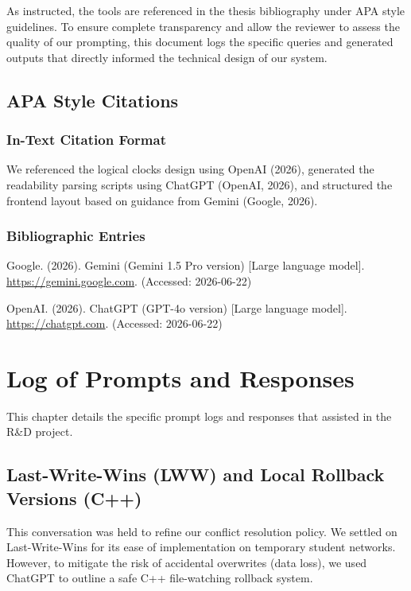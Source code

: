 \documentclass[12pt,oneside]{report}
\newenvironment{hangparas}[2]{
  \setlength{\parindent}{-#1}
  \setlength{\leftmargin}{#1}
  \setlength{\itemindent}{-#1}
  \list{}{
    \setlength{\leftmargin}{#1}
    \setlength{\itemindent}{-#1}
    \setlength{\parsep}{\parskip}
  }
  \item[]
}{
  \endlist
}
\begin{document}
As instructed, the tools are referenced in the thesis bibliography under APA style guidelines. To ensure complete transparency and allow the reviewer to assess the quality of our prompting, this document logs the specific queries and generated outputs that directly informed the technical design of our system.

\section*{APA Style Citations}

\subsection*{In-Text Citation Format}
We referenced the logical clocks design using OpenAI (2026), generated the readability parsing scripts using ChatGPT (OpenAI, 2026), and structured the frontend layout based on guidance from Gemini (Google, 2026).

\subsection*{Bibliographic Entries}
\begin{hangparas}{.5in}{1}
Google. (2026). Gemini (Gemini 1.5 Pro version) [Large language model]. \url{https://gemini.google.com}. (Accessed: 2026-06-22)

OpenAI. (2026). ChatGPT (GPT-4o version) [Large language model]. \url{https://chatgpt.com}. (Accessed: 2026-06-22)
\end{hangparas}


\newpage
\chapter{Log of Prompts and Responses}

This chapter details the specific prompt logs and responses that assisted in the R\&D project.

\section{Last-Write-Wins (LWW) and Local Rollback Versions (C++)}

This conversation was held to refine our conflict resolution policy. We settled on Last-Write-Wins for its ease of implementation on temporary student networks. However, to mitigate the risk of accidental overwrites (data loss), we used ChatGPT to outline a safe C++ file-watching rollback system.
\end{document}
